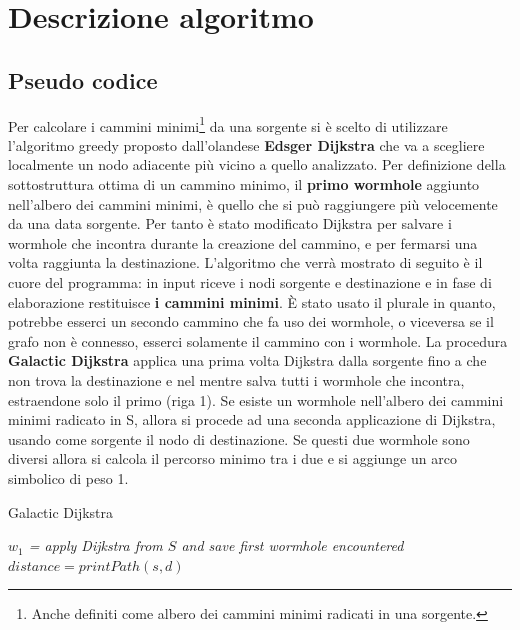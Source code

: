 \def\baselinestretch{1}
\section{Descrizione algoritmo}
\def\baselinestretch{1.66}
\thispagestyle{headings}

\subsection{Pseudo codice}\label{gg}
\indent Per calcolare i cammini minimi\footnote{Anche definiti
come albero dei cammini minimi radicati in una sorgente.} da una sorgente si \`e
scelto di utilizzare l'algoritmo greedy proposto dall'olandese \textbf{Edsger 
Dijkstra} che va a scegliere localmente 
un nodo adiacente pi\`u vicino a quello analizzato. Per
definizione della sottostruttura ottima di un cammino minimo, il
\textbf{primo wormhole} aggiunto nell'albero dei cammini minimi, \`e
quello che si pu\`o raggiungere pi\`u velocemente da una data
sorgente. Per tanto \`e stato modificato Dijkstra per salvare i wormhole che
incontra durante la creazione del cammino, e per fermarsi una volta raggiunta la destinazione.\newline
\indent L'algoritmo che verr\`a mostrato di seguito \`e il cuore
del programma: in input riceve i nodi sorgente e destinazione
e in fase di elaborazione restituisce \textbf{i cammini minimi}. \`E stato usato
il plurale in quanto, potrebbe esserci un secondo cammino
che fa uso dei wormhole, o viceversa se il grafo non
\`e connesso, esserci solamente il cammino con i wormhole.\newline
\indent La procedura \textbf{Galactic Dijkstra} applica una prima volta 
Dijkstra dalla sorgente fino a che non trova la
destinazione e nel mentre salva tutti i wormhole che incontra,
estraendone solo il primo (riga 1).
Se esiste un wormhole nell'albero dei cammini minimi radicato in S,
allora si procede ad una seconda applicazione di Dijkstra, usando
come sorgente il nodo di destinazione. Se questi due wormhole
sono diversi allora si calcola il percorso minimo tra i due e si
aggiunge un arco simbolico di peso 1.\newline


\IncMargin{1.5em}
\begin{algorithm}[H]
\caption{Galactic Dijkstra}
\BlankLine\BlankLine
{}
\BlankLine
\emph{$w_1$ = apply Dijkstra from $S$ and save first wormhole encountered}\;
$distance = printPath(s, d)$\;
\BlankLine
\end{algorithm}
\DecMargin{1em}

